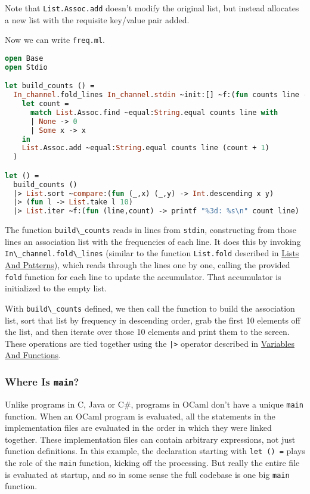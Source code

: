 Note that \passthrough{\lstinline!List.Assoc.add!} doesn't modify the
original list, but instead allocates a new list with the requisite
key/value pair added.

Now we can write \passthrough{\lstinline!freq.ml!}.

\begin{lstlisting}[language=Caml]
open Base
open Stdio

let build_counts () =
  In_channel.fold_lines In_channel.stdin ~init:[] ~f:(fun counts line ->
    let count =
      match List.Assoc.find ~equal:String.equal counts line with
      | None -> 0
      | Some x -> x
    in
    List.Assoc.add ~equal:String.equal counts line (count + 1)
  )

let () =
  build_counts ()
  |> List.sort ~compare:(fun (_,x) (_,y) -> Int.descending x y)
  |> (fun l -> List.take l 10)
  |> List.iter ~f:(fun (line,count) -> printf "%3d: %s\n" count line)
\end{lstlisting}

The function \passthrough{\lstinline!build\_counts!} reads in lines from
\passthrough{\lstinline!stdin!}, constructing from those lines an
association list with the frequencies of each line. It does this by
invoking \passthrough{\lstinline!In\_channel.fold\_lines!} (similar to
the function \passthrough{\lstinline!List.fold!} described in
\href{lists-and-patterns.html\#lists-and-patterns}{Lists And Patterns}),
which reads through the lines one by one, calling the provided
\passthrough{\lstinline!fold!} function for each line to update the
accumulator. That accumulator is initialized to the empty list.

With \passthrough{\lstinline!build\_counts!} defined, we then call the
function to build the association list, sort that list by frequency in
descending order, grab the first 10 elements off the list, and then
iterate over those 10 elements and print them to the screen. These
operations are tied together using the \passthrough{\lstinline!|>!}
operator described in
\href{variables-and-functions.html\#prefix-and-infix-operators}{Variables
And Functions}. 

\hypertarget{where-is-main}{%
\subsubsection{\texorpdfstring{Where Is
\texttt{main}?}{Where Is main?}}\label{where-is-main}}

Unlike programs in C, Java or C\#, programs in OCaml don't have a unique
\passthrough{\lstinline!main!} function. When an OCaml program is
evaluated, all the statements in the implementation files are evaluated
in the order in which they were linked together. These implementation
files can contain arbitrary expressions, not just function definitions.
In this example, the declaration starting with
\passthrough{\lstinline!let () =!} plays the role of the
\passthrough{\lstinline!main!} function, kicking off the processing. But
really the entire file is evaluated at startup, and so in some sense the
full codebase is one big \passthrough{\lstinline!main!} function.

